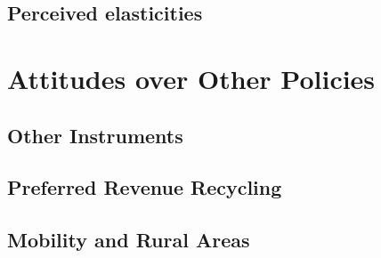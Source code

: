 \documentclass[11pt]{article}
\begin{document}

    \subsection{Perceived elasticities}



\section{Attitudes over Other Policies}

    \subsection{Other Instruments}


    \subsection{Preferred Revenue Recycling}


    \subsection{Mobility and Rural Areas}

\end{document}
